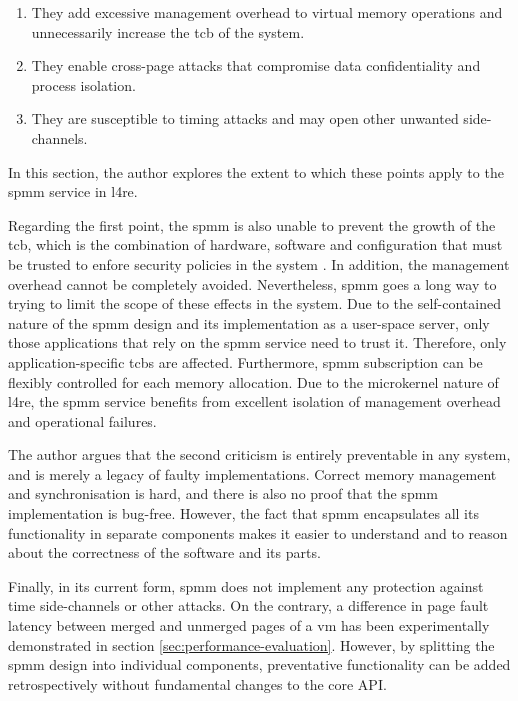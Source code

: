 \begin{enumerate}
  \item They add excessive management overhead to virtual memory operations and unnecessarily increase the \ac{tcb} of the system.
  \item They enable cross-page attacks that compromise data confidentiality and process isolation.
  \item They are susceptible to timing attacks and may open other unwanted side-channels.
\end{enumerate}

In this section, the author explores the extent to which these points apply to the \ac{spmm} service in \ac{l4re}.

Regarding the first point, the \ac{spmm} is also unable to prevent the growth of the \ac{tcb}, which is the combination of hardware, software and configuration that must be trusted to enfore security policies in the system \cite{tcsec1986}.
In addition, the management overhead cannot be completely avoided.
Nevertheless, \ac{spmm} goes a long way to trying to limit the scope of these effects in the system.
Due to the self-contained nature of the \ac{spmm} design and its implementation as a user-space server, only those applications that rely on the \ac{spmm} service need to trust it.
Therefore, only application-specific \acp{tcb} are affected.
Furthermore, \ac{spmm} subscription can be flexibly controlled for each memory allocation.
Due to the microkernel nature of \ac{l4re}, the \ac{spmm} service benefits from excellent isolation of management overhead and operational failures.

The author argues that the second criticism is entirely preventable in any system, and is merely a legacy of faulty implementations.
Correct memory management and synchronisation is hard, and there is also no proof that the \ac{spmm} implementation is bug-free.
However, the fact that \ac{spmm} encapsulates all its functionality in separate components makes it easier to understand and to reason about the correctness of the software and its parts.

Finally, in its current form, \ac{spmm} does not implement any protection against time side-channels or other attacks.
On the contrary, a difference in page fault latency between merged and unmerged pages of a \ac{vm} has been experimentally demonstrated in section \ref{sec:performance-evaluation}.
However, by splitting the \ac{spmm} design into individual components, preventative functionality can be added retrospectively without fundamental changes to the core API.
